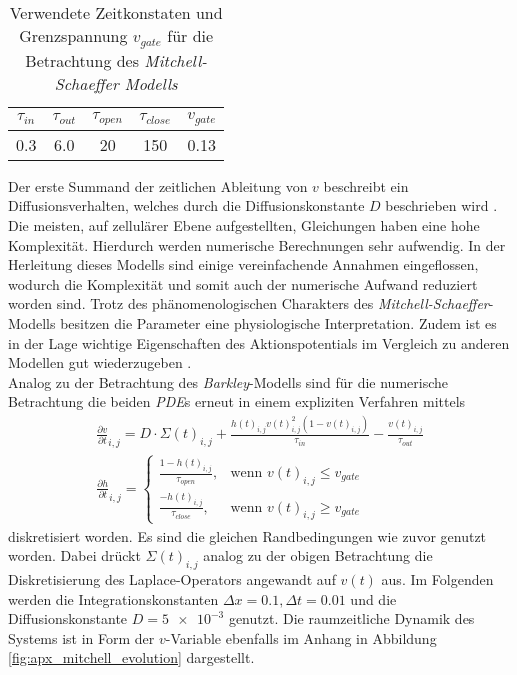 \begin{table}[H]
\centering
\begin{tabular}{ccccc}
\hline 
$\tau_{in}$ & $\tau_{out}$ & $\tau_{open}$ & $\tau_{close}$ & $v_{gate}$ \\ 
\hline
0.3 & 6.0 & 20 & 150 & 0.13 \\ 
\hline 
\end{tabular} 
\caption{Verwendete Zeitkonstaten und Grenzspannung $v_{gate}$ für die Betrachtung des \textit{Mitchell-Schaeffer Modells}}
\label{tab:ms_parameters}
\end{table}

Der erste Summand der zeitlichen Ableitung von $v$ beschreibt ein Diffusionsverhalten, welches durch die Diffusionskonstante $D$ beschrieben wird \citep{talbot2013towards}.\\

Die meisten, auf zellulärer Ebene aufgestellten, Gleichungen haben eine hohe Komplexität. Hierdurch werden numerische Berechnungen sehr aufwendig. In der Herleitung dieses Modells sind einige vereinfachende Annahmen eingeflossen, wodurch die Komplexität und somit auch der numerische Aufwand reduziert worden sind. Trotz des phänomenologischen Charakters des \textit{Mitchell-Schaeffer}-Modells besitzen die Parameter eine physiologische Interpretation. Zudem ist es in der Lage wichtige Eigenschaften des Aktionspotentials im Vergleich zu anderen Modellen gut wiederzugeben \citep{talbot2013towards}.\\

Analog zu der Betrachtung des \textit{Barkley}-Modells sind für die numerische Betrachtung die beiden \textit{PDE}s erneut in einem expliziten Verfahren mittels
\begin{equation}
\begin{gathered}
\frac{\partial v}{\partial t}_{i,j} = D \cdot \Sigma(t)_{i,j} + \frac{h(t)_{i,j} v(t)_{i,j}^2(1-v(t)_{i,j})}{\tau_{in}} - \frac{v(t)_{i,j}}{\tau_{out}}\\
\frac{\partial h}{\partial t}_{i,j} = \begin{cases}
	\frac{1-h(t)_{i,j}}{\tau_{open}},& \text{wenn } v(t)_{i,j} \leq v_{gate}\\
    \frac{-h(t)_{i,j}}{\tau_{close}},& \text{wenn } v(t)_{i,j} \geq v_{gate}
\end{cases}
\end{gathered}
\end{equation}
diskretisiert worden. Es sind die gleichen Randbedingungen wie zuvor genutzt worden. Dabei drückt $\Sigma(t)_{i, j}$ analog zu der obigen Betrachtung die Diskretisierung des Laplace-Operators angewandt auf $v(t)$ aus. Im Folgenden werden die Integrationskonstanten $\Delta x = 0.1, \Delta t = 0.01$ und die Diffusionskonstante $D = \num{5e-3}$ genutzt. Die raumzeitliche Dynamik des Systems ist in Form der $v$-Variable ebenfalls im Anhang in Abbildung \ref{fig:apx_mitchell_evolution} dargestellt.\\